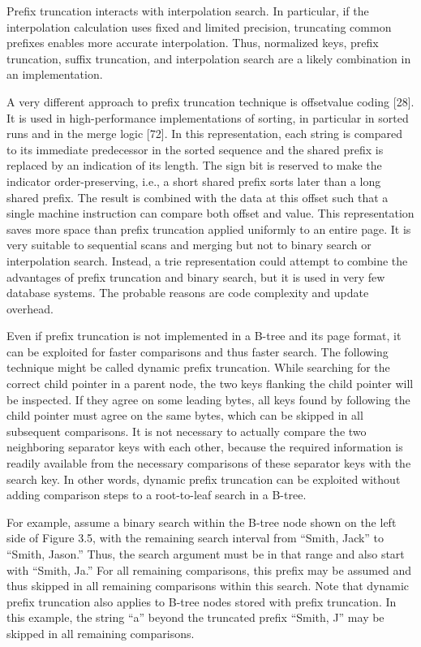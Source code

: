 Prefix truncation interacts with interpolation search. In particular, if
the interpolation calculation uses fixed and limited precision,
truncating common prefixes enables more accurate interpolation. Thus,
normalized keys, prefix truncation, suffix truncation, and interpolation
search are a likely combination in an implementation.

A very different approach to prefix truncation technique is offsetvalue
coding {[}28{]}. It is used in high-performance implementations of
sorting, in particular in sorted runs and in the merge logic {[}72{]}.
In this representation, each string is compared to its immediate
predecessor in the sorted sequence and the shared prefix is replaced by
an indication of its length. The sign bit is reserved to make the
indicator order-preserving, i.e., a short shared prefix sorts later than
a long shared prefix. The result is combined with the data at this
offset such that a single machine instruction can compare both offset
and value. This representation saves more space than prefix truncation
applied uniformly to an entire page. It is very suitable to sequential
scans and merging but not to binary search or interpolation search.
Instead, a trie representation could attempt to combine the advantages
of prefix truncation and binary search, but it is used in very few
database systems. The probable reasons are code complexity and update
overhead.

Even if prefix truncation is not implemented in a B-tree and its page
format, it can be exploited for faster comparisons and thus faster
search. The following technique might be called dynamic prefix
truncation. While searching for the correct child pointer in a parent
node, the two keys flanking the child pointer will be inspected. If they
agree on some leading bytes, all keys found by following the child
pointer must agree on the same bytes, which can be skipped in all
subsequent comparisons. It is not necessary to actually compare the two
neighboring separator keys with each other, because the required
information is readily available from the necessary comparisons of these
separator keys with the search key. In other words, dynamic prefix
truncation can be exploited without adding comparison steps to a
root-to-leaf search in a B-tree.

For example, assume a binary search within the B-tree node shown on the
left side of Figure 3.5, with the remaining search interval from
``Smith, Jack'' to ``Smith, Jason.'' Thus, the search argument must be
in that range and also start with ``Smith, Ja.'' For all remaining
comparisons, this prefix may be assumed and thus skipped in all
remaining comparisons within this search. Note that dynamic prefix
truncation also applies to B-tree nodes stored with prefix truncation.
In this example, the string ``a'' beyond the truncated prefix ``Smith,
J'' may be skipped in all remaining comparisons.

